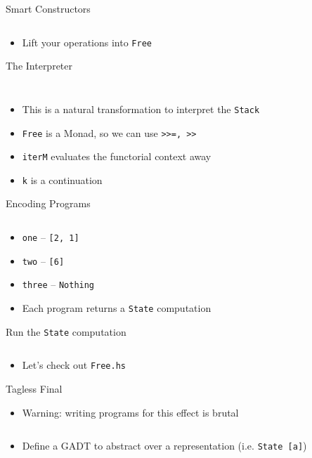 \documentclass[hyperref={pdfpagelabels=false},12pt]{beamer}
\newcommand{\code}[2]{\texttt{#2}}
\newcommand{\haskell}[1]{\code{haskell}{#1}}
\newcommand{\bash}[1]{\code{bash}{#1}}
\newcommand{\pygmentLines}[5]{\inputminted[bgcolor=lightgray,linenos,fontsize=#1,firstline=#2,lastline=#3,autogobble]{#4}{#5}}
\begin{document}
\begin{frame}{Smart Constructors}
  \pygmentLines{\normalsize}{25}{32}{haskell}{code/Free.hs}
  \begin{itemize}
    \item Lift your operations into \haskell{Free}
  \end{itemize}
\end{frame}

\begin{frame}{The Interpreter}
  \pygmentLines{\scriptsize}{10}{11}{haskell}{code/Free.hs}
  \vspace{-1cm}
  \pygmentLines{\normalsize}{34}{40}{haskell}{code/Free.hs}
  \vspace{-0.5cm}
  \begin{itemize}
    \item This is a natural transformation to interpret the \haskell{Stack}
    \item \haskell{Free} is a Monad, so we can use \haskell{>>=, >>}
    \item \haskell{iterM} evaluates the functorial context away
    \item \haskell{k} is a continuation
  \end{itemize}
\end{frame}

\begin{frame}{Encoding Programs}
  \pygmentLines{\scriptsize}{42}{56}{haskell}{code/Free.hs}
  \vspace{-0.5cm}
  \begin{itemize}
    \item \haskell{one} -- \haskell{[2, 1]}
    \item \haskell{two} -- \haskell{[6]}
    \item \haskell{three} -- \haskell{Nothing}
    \item Each program returns a \haskell{State} computation
  \end{itemize}
\end{frame}

\begin{frame}{Run the \haskell{State} computation}
  \pygmentLines{\scriptsize}{58}{62}{haskell}{code/Free.hs}
  \begin{itemize}
    \item Let's check out \bash{Free.hs}
  \end{itemize}
\end{frame}

\begin{frame}{Tagless Final}
  \begin{itemize}
    \item Warning: writing programs for this effect is brutal
  \end{itemize}
  \pygmentLines{\normalsize}{15}{18}{haskell}{code/TaglessFinal.hs}
  \begin{itemize}
    \item Define a GADT to abstract over a representation (i.e. \haskell{State [a]})
  \end{itemize}
\end{frame}
\end{document}
